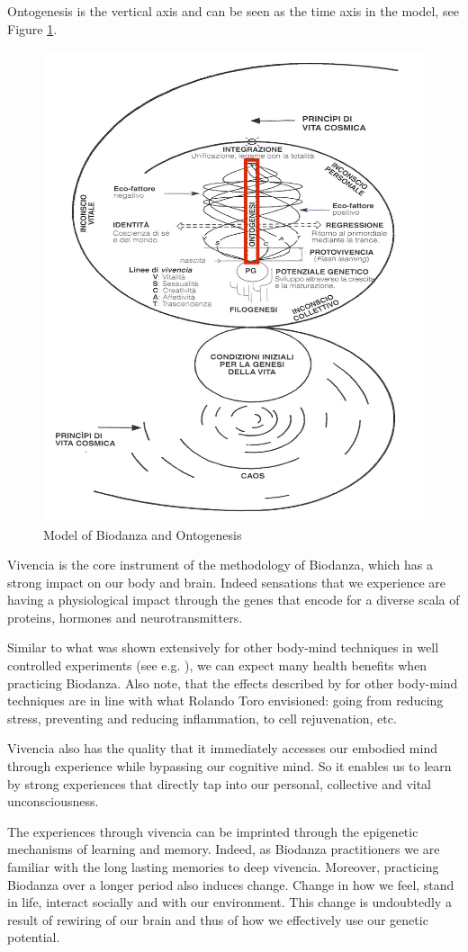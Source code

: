 \documentclass[
  11pt,
]{book}
\begin{document}
Ontogenesis is the vertical axis and can be seen as the time axis in the model, see Figure \ref{fig:modelOnto2}.

\begin{figure}

{\centering \includegraphics[width=0.5\linewidth]{./figs/biologischeAspectenBiodanzaDeelIII} 

}

\caption{Model of Biodanza and Ontogenesis}\label{fig:modelOnto2}
\end{figure}

Vivencia is the core instrument of the methodology of Biodanza, which has a strong impact on our body and brain. Indeed sensations that we experience are having a physiological impact through the genes that encode for a diverse scala of proteins, hormones and neurotransmitters.

Similar to what was shown extensively for other body-mind techniques in well controlled experiments (see e.g. \citet{BlackburnEpel2017}), we can expect many health benefits when practicing Biodanza. Also note, that the effects described by \citet{BlackburnEpel2017} for other body-mind techniques are in line with what Rolando Toro envisioned: going from reducing stress, preventing and reducing inflammation, to cell rejuvenation, etc.

Vivencia also has the quality that it immediately accesses our embodied mind through experience while bypassing our cognitive mind. So it enables us to learn by strong experiences that directly tap into our personal, collective and vital unconsciousness.

The experiences through vivencia can be imprinted through the epigenetic mechanisms of learning and memory. Indeed, as Biodanza practitioners we are familiar with the long lasting memories to deep vivencia. Moreover, practicing Biodanza over a longer period also induces change.
Change in how we feel, stand in life, interact socially and with our environment.
This change is undoubtedly a result of rewiring of our brain and thus of how we effectively use our genetic potential.
\end{document}
